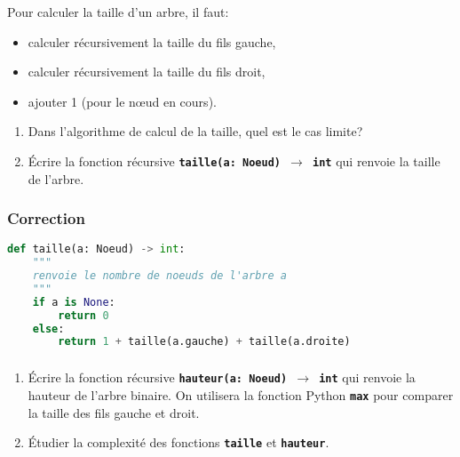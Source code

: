 \documentclass[svgnames,11pt]{beamer}
\begin{document}
\begin{frame}
    \frametitle{}

Pour calculer la taille d'un arbre, il faut:
\begin{itemize}
    \item calculer récursivement la taille du fils gauche,
    \item calculer récursivement la taille du fils droit,
    \item ajouter 1 (pour le nœud en cours).
\end{itemize}
\begin{activite}
\begin{enumerate}
    \item Dans l'algorithme de calcul de la taille, quel est le cas limite?
    \item Écrire la fonction récursive \textbf{\texttt{taille(a: Noeud) $\rightarrow$ int}} qui renvoie la taille de l'arbre.
\end{enumerate}
\end{activite}
\end{frame}
\begin{frame}[fragile]
    \frametitle{Correction}

\begin{center}
\begin{lstlisting}[language=Python , basicstyle=\ttfamily\small, xleftmargin=.5em, xrightmargin=-1em]
def taille(a: Noeud) -> int:
    """
    renvoie le nombre de noeuds de l'arbre a
    """
    if a is None:
        return 0
    else:
        return 1 + taille(a.gauche) + taille(a.droite)
\end{lstlisting}
\label{CODE}
\end{center}    

\end{frame}
\begin{frame}
    \frametitle{}

\begin{activite}
\begin{enumerate}
    \item Écrire la fonction récursive \textbf{\texttt{hauteur(a: Noeud) $\rightarrow$ int}} qui renvoie la hauteur de l'arbre binaire. On utilisera la fonction Python \textbf{\texttt{max}} pour comparer la taille des fils gauche et droit.
    \item Étudier la complexité des fonctions \textbf{\texttt{taille}} et \textbf{\texttt{hauteur}}.
\end{enumerate}
\end{activite}

\end{frame}
\end{document}
